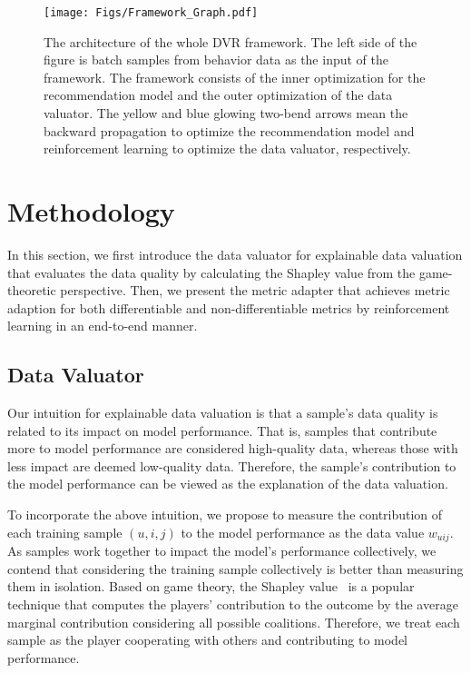 \begin{figure*}[h]
    \centering
    \texttt{[image: Figs/Framework\_Graph.pdf]}
    \caption{The architecture of the whole DVR framework. The left side of the figure is batch samples from behavior data as the input of the framework. The framework consists of the inner optimization for the recommendation model and the outer optimization of the data valuator. The yellow and blue glowing two-bend arrows mean the backward propagation to optimize the recommendation model and reinforcement learning to optimize the data valuator, respectively.}
    \label{fig:framework}
\end{figure*}

\section{Methodology}
In this section, we first introduce the data valuator for explainable data valuation that evaluates the data quality by calculating the Shapley value from the game-theoretic perspective. Then, we present the metric adapter that achieves metric adaption for both differentiable and non-differentiable metrics by reinforcement learning in an end-to-end manner.

\subsection{Data Valuator}

Our intuition for explainable data valuation is that a sample's data quality is related to its impact on model performance. That is, samples that contribute more to model performance are considered high-quality data, whereas those with less impact are deemed low-quality data. Therefore, the sample's contribution to the model performance can be viewed as the explanation of the data valuation. 

To incorporate the above intuition, we propose to measure the contribution of each training sample $(u, i, j)$ to the model performance as the data value $w_{uij}$. As samples work together to impact the model's performance collectively, we contend that considering the training sample collectively is better than measuring them in isolation. Based on game theory, the Shapley value~\cite{winter2002shapley} is a popular technique that computes the players' contribution to the outcome by the average marginal contribution considering all possible coalitions. Therefore, we treat each sample as the player cooperating with others and contributing to model performance.

